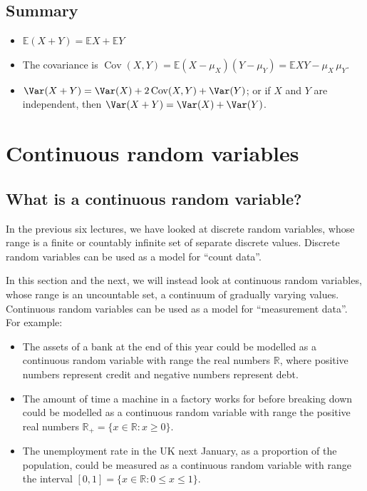 \documentclass[
  letterpaper,
  DIV=11,
  numbers=noendperiod]{scrreprt}
\providecommand{\tightlist}{%
  \setlength{\itemsep}{0pt}\setlength{\parskip}{0pt}}\usepackage{longtable,booktabs,array}
\theoremstyle{remark}
\begin{document}
\hypertarget{summary-L14}{%
\section*{Summary}\label{summary-L14}}


\begin{itemize}
\tightlist
\item
  \(\mathbb E(X + Y) = \mathbb EX + \mathbb EY\)
\item
  The covariance is
  \(\operatorname{Cov}(X,Y) = \mathbb E(X - \mu_X)(Y - \mu_Y) = \mathbb EXY - \mu_X \,\mu_Y\).
\item
  \(\Var(X + Y) = \Var(X) + 2\operatorname{Cov}(X,Y) + \Var(Y)\); or if
  \(X\) and \(Y\) are independent, then
  \(\Var(X + Y) = \Var(X) + \Var(Y)\).
\end{itemize}

\hypertarget{L15-continuous}{%
\chapter{Continuous random variables}\label{L15-continuous}}

\hypertarget{continuous-rv}{%
\section{What is a continuous random variable?}\label{continuous-rv}}

In the previous six lectures, we have looked at discrete random
variables, whose range is a finite or countably infinite set of separate
discrete values. Discrete random variables can be used as a model for
``count data''.

In this section and the next, we will instead look at continuous random
variables, whose range is an uncountable set, a continuum of gradually
varying values. Continuous random variables can be used as a model for
``measurement data''. For example:

\begin{itemize}
\tightlist
\item
  The assets of a bank at the end of this year could be modelled as a
  continuous random variable with range the real numbers \(\mathbb R\),
  where positive numbers represent credit and negative numbers represent
  debt.
\item
  The amount of time a machine in a factory works for before breaking
  down could be modelled as a continuous random variable with range the
  positive real numbers
  \(\mathbb R_+ = \{x \in \mathbb R : x \geq 0\}\).
\item
  The unemployment rate in the UK next January, as a proportion of the
  population, could be measured as a continuous random variable with
  range the interval \([0, 1] = \{x \in \mathbb R : 0 \leq x \leq 1\}\).
\end{itemize}
\end{document}
